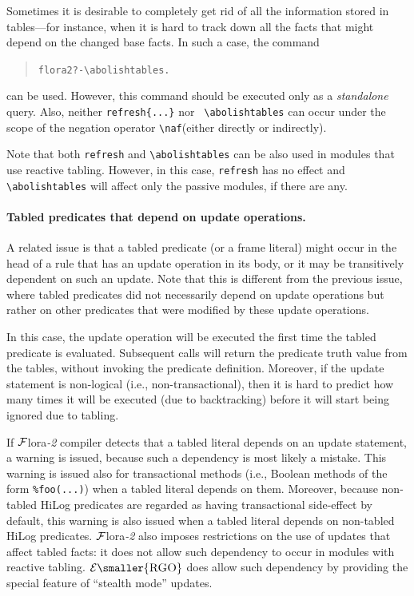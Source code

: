 \documentclass[11pt]{article}
\newcommand{\FLORA}{{\mbox{\sc ${\cal F}${lora}\rm\emph{-2}}}\xspace}
\newcommand{\ERGO}{\ensuremath{\cal{E}\mbox{\smaller{\sc{RGO}}}}\xspace}
\newcommand{\FLSYSTEM}{\FLORA}
\newcommand{\prompt}{flora2 ?- }
\newcommand{\bs}{\textbackslash}
\newcommand{\RULELOGNAF}{{\texttt{{\bs}naf}}\xspace}
\begin{document}
\index{\bs{}abolishtables}
Sometimes it is desirable to completely get rid of all the information
stored in tables---for instance, when it is hard to track down all the facts
that might depend on the changed base facts. In such a case, the command
\begin{quote}
\begin{alltt}
\prompt \bs{}abolishtables.
\end{alltt}
\end{quote}
can be used. However, this command should be executed only as
a \emph{standalone} query.
Also, neither {\tt refresh\{...\}} nor {\tt
  \bs{}abolishtables} can occur under the scope of the
negation operator  \RULELOGNAF (either directly or indirectly).

Note that both \texttt{refresh} and \texttt{\bs{}abolishtables} can be also
used in modules that use reactive tabling. However, in this case,
\texttt{refresh} has no effect and \texttt{\bs{}abolishtables} will affect only
the passive modules, if there are any.

\paragraph{Tabled predicates that depend on update operations.}
\label{page-depchk}
A related issue is that a tabled predicate (or a frame literal)
might occur in the head of a rule that has an update operation in its body,
or it may be transitively dependent on such an update. Note that this is
different from the previous issue, where tabled predicates did not
necessarily depend on update operations but rather on other predicates that
were modified by these update operations.

In this case, the update operation will be executed the first time the
tabled predicate is evaluated. Subsequent calls will return the predicate truth
value from the tables, without invoking the predicate definition.
Moreover, if the update statement is non-logical (i.e.,
non-transactional), then it is hard to predict how many times it will be
executed (due to backtracking) before it will start being ignored due to
tabling.

If \FLSYSTEM compiler detects that a tabled literal depends on an update
statement, a warning is issued, because such a dependency is most likely a
mistake. This warning is issued also for transactional methods (i.e.,
Boolean methods of the form {\tt \%foo(...)}) when a tabled literal depends
on them. Moreover, because non-tabled HiLog predicates are regarded as having
transactional side-effect by default, this warning is also issued when a
tabled literal depends on non-tabled HiLog predicates.
\FLORA also
imposes restrictions on the use of updates that affect tabled
facts: it does not allow such dependency to occur in modules with
reactive tabling.
\ERGO does allow such dependency by providing
the special feature of ``stealth mode'' updates.
\end{document}
